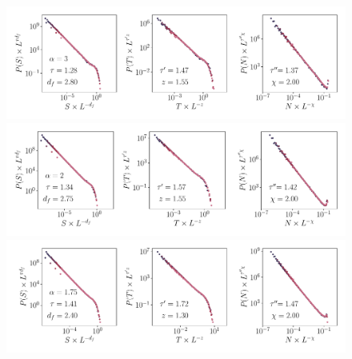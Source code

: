 \begin{figure}[h]
\centering
\includegraphics[width=\textwidth]{Chapitre3/Figures/Avalanches/Rescale_Av_alpha3.pdf}
\includegraphics[width=\textwidth]{Chapitre3/Figures/Avalanches/Rescale_Av_alpha2.pdf}
\includegraphics[width=\textwidth]{Chapitre3/Figures/Avalanches/Rescale_Av_alpha175.pdf}
\caption{}
\label{fig:annexeAvTBLRR1}
\end{figure}

